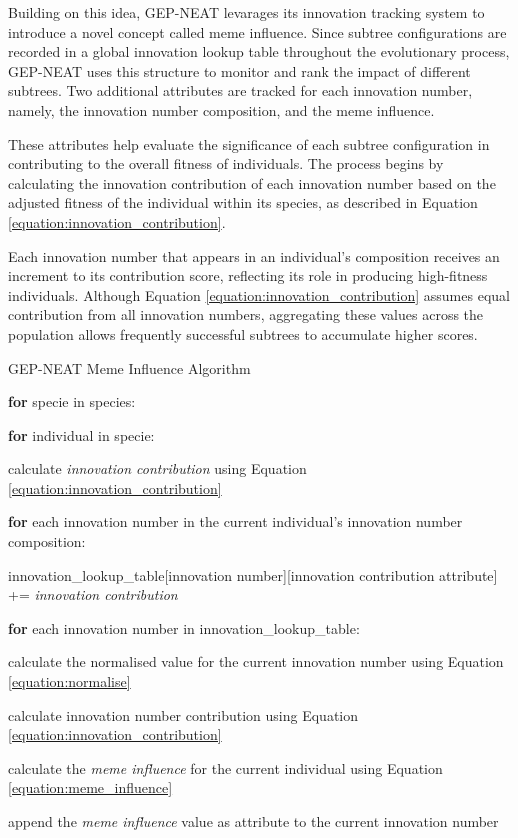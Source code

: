 \parbreak\noindent Building on this idea, GEP-NEAT levarages its innovation tracking system to introduce a novel concept called meme influence. Since subtree configurations are recorded in a global innovation lookup table throughout the evolutionary process, GEP-NEAT uses this structure to monitor and rank the impact of different subtrees. Two additional attributes are tracked for each innovation number, namely, the innovation number composition, and the meme influence.

\parbreak\noindent These attributes help evaluate the significance of each subtree configuration in contributing to the overall fitness of individuals. The process begins by calculating the innovation contribution of each innovation number based on the adjusted fitness of the individual within its species, as described in Equation \ref{equation:innovation_contribution}.

\parbreak\noindent Each innovation number that appears in an individual's composition receives an increment to its contribution score, reflecting its role in producing high-fitness individuals. Although Equation \ref{equation:innovation_contribution} assumes equal contribution from all innovation numbers, aggregating these values across the population allows frequently successful subtrees to accumulate higher scores.

\parbreak
\begin{algorithm}[H]
	\caption{GEP-NEAT Meme Influence Algorithm}\label{alg:meme_influence}
	\begin{algorithmic}[1]
	\item \textbf{for} specie in species:
	\item \quad \textbf{for} individual in specie:
	\item \quad \quad calculate \textit{innovation contribution} using Equation \ref{equation:innovation_contribution}
	\item \quad \quad \textbf{for} each innovation number in the current individual's innovation number composition:
	\item \quad \quad \quad innovation\_lookup\_table[innovation number][innovation contribution attribute] += \textit{innovation contribution}
	
	\item 

	\item \textbf{for} each innovation number in innovation\_lookup\_table:
	\item \quad calculate the normalised value for the current innovation number using Equation \ref{equation:normalise}
	\item \quad calculate innovation number contribution using Equation \ref{equation:innovation_contribution}
	\item \quad calculate the \textit{meme influence} for the current individual using Equation \ref{equation:meme_influence}
	\item \quad append the \textit{meme influence} value as attribute to the current innovation number
\end{algorithmic}
\end{algorithm}

